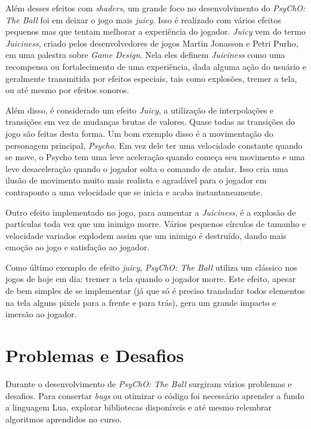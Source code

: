 Além desses efeitos com \textit{shaders}, um grande foco no desenvolvimento do \textit{PsyChO: The Ball} foi em deixar o jogo mais \textit{juicy}. Isso é realizado com vários efeitos pequenos mas que tentam melhorar a experiência do jogador. \textit{Juicy} vem do termo \textit{Juiciness}, criado pelos desenvolvedores de jogos Martin Jonasson e Petri Purho, em uma palestra sobre \textit{Game Design}\cite{martinpetri}. Nela eles definem \textit{Juiciness} como uma recompensa ou fortalecimento de uma experiência, dada alguma ação do usuário e geralmente transmitida por efeitos especiais, tais como explosões, tremer a tela, ou até mesmo por efeitos sonoros.

Além disso, é considerado um efeito \textit{Juicy}, a utilização de interpolações e transições em vez de mudanças brutas de valores. Quase todas as transições do jogo são feitas desta forma. Um bom exemplo disso é a movimentação do personagem principal, \textit{Psycho}. Em vez dele ter uma velocidade constante quando se move, o Psycho tem uma leve aceleração quando começa seu movimento e uma leve desaceleração quando o jogador solta o comando de andar. Isso cria uma ilusão de movimento muito mais realista e agradável para o jogador em contraponto a uma velocidade que se inicia e acaba instantaneamente.

Outro efeito implementado no jogo, para aumentar a \textit{Juiciness}, é a explosão de partículas toda vez que um inimigo morre. Vários pequenos círculos de tamanho e velocidade variados explodem assim que um inimigo é destruído, dando mais emoção ao jogo e satisfação ao jogador.

Como último exemplo de efeito \textit{juicy}, \textit{PsyChO: The Ball} utiliza um clássico nos jogos de hoje em dia: tremer a tela quando o jogador morre. Este efeito, apesar de bem simples de se implementar (já que só é preciso transladar todos elementos na tela alguns pixels para a frente e para trás), gera um grande impacto e imersão ao jogador.

\section{Problemas e Desafios}
\label{sec:problemas_e_desafios}

Durante o desenvolvimento de \textit{PsyChO: The Ball} surgiram vários problemas e desafios. Para consertar \textit{bugs} ou otimizar o código foi necessário aprender a fundo a linguagem Lua, explorar bibliotecas disponíveis e até mesmo relembrar algoritmos aprendidos no curso.


